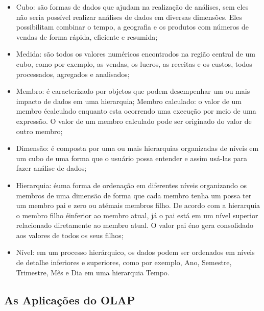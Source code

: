 \begin{itemize}

    \item Cubo: s\~{a}o formas de dados que ajudam na realiza\c{c}\~{a}o de an\'{a}lises, sem eles n\~{a}o seria poss\'{i}vel realizar an\'{a}lises de dados em diversas dimens\~{o}es. Eles possibilitam combinar o tempo, a geografia e os produtos com números de vendas de forma r\'{a}pida, eficiente e resumida;
    
    \item Medida: s\~{a}o todos os valores num\'{e}ricos encontrados na regi\~{a}o central de um cubo, como por exemplo, as vendas, os lucros, as receitas e os custos, todos processados, agregados e analisados;
    
    \item Membro: \'{e} caracterizado por objetos que podem desempenhar um ou mais impacto de dados em uma hierarquia; Membro calculado: o valor de um membro \'{e}calculado enquanto esta ocorrendo uma execu\c{c}\~{a}o por meio de uma express\~{a}o. O valor de um membro calculado pode ser originado do valor de outro membro;
    
    \item Dimens\~{a}o: \'{e} composta por uma ou mais hierarquias organizadas de n\'{i}veis em um cubo de uma forma que o usu\'{a}rio possa entender e assim us\'{a}-las para fazer an\'{a}lise de dados;
    
    \item Hierarquia: \'{e}uma forma de ordena\c{c}\~{a}o em diferentes n\'{i}veis organizando os membros de uma dimens\~{a}o de forma que cada membro tenha um possa ter um membro pai e zero ou at\'{e}mais membros filho. De acordo com a hierarquia o membro filho \'{e}inferior ao membro atual, j\'{a} o pai est\'{a} em um n\'{i}vel superior relacionado diretamente ao membro atual. O valor pai \'{e}no gera consolidado aos valores de todos os seus filhos;
    
    \item N\'{i}vel: em um processo hier\'{a}rquico, os dados podem ser ordenados em n\'{i}veis de detalhe inferiores e superiores, como por exemplo, Ano, Semestre, Trimestre, Mês e Dia em uma hierarquia Tempo.

\end{itemize}

\subsection{As Aplica\c{c}\~{o}es do OLAP}

